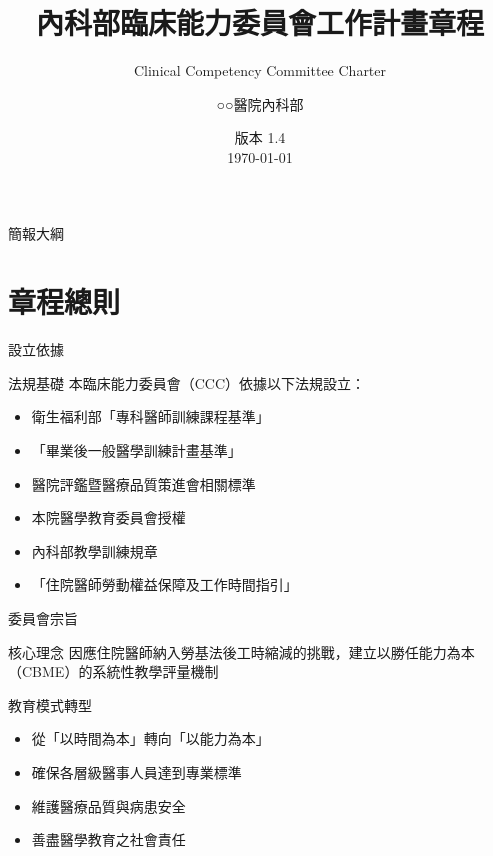 \documentclass[aspectratio=169,12pt]{beamer}
\title[CCC委員會章程]{內科部臨床能力委員會工作計畫章程}
\subtitle{Clinical Competency Committee Charter}
\author{○○醫院內科部}
\date{版本 1.4 \\ \today}
\institute{內科部教學委員會}
\begin{document}
\begin{frame}
\titlepage
\end{frame}

\begin{frame}{簡報大綱}
\tableofcontents
\end{frame}

\section{章程總則}

\begin{frame}{設立依據}
\begin{block}{法規基礎}
本臨床能力委員會（CCC）依據以下法規設立：
\end{block}
\begin{itemize}
    \item 衛生福利部「專科醫師訓練課程基準」
    \item 「畢業後一般醫學訓練計畫基準」
    \item 醫院評鑑暨醫療品質策進會相關標準
    \item 本院醫學教育委員會授權
    \item 內科部教學訓練規章
    \item 「住院醫師勞動權益保障及工作時間指引」
\end{itemize}
\end{frame}

\begin{frame}{委員會宗旨}
\begin{alertblock}{核心理念}
因應住院醫師納入勞基法後工時縮減的挑戰，建立以勝任能力為本（CBME）的系統性教學評量機制
\end{alertblock}

\begin{block}{教育模式轉型}
\begin{itemize}
    \item 從「以時間為本」轉向「以能力為本」
    \item 確保各層級醫事人員達到專業標準
    \item 維護醫療品質與病患安全
    \item 善盡醫學教育之社會責任
\end{itemize}
\end{block}
\end{frame}
\end{document}
